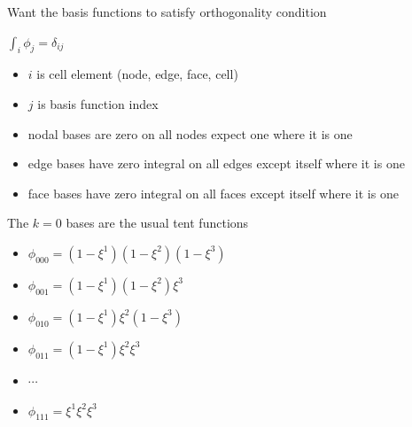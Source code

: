\documentclass[aspectratio=169]{beamer}
\begin{document}
\begin{frame}[fragile]{Want the basis functions to satisfy orthogonality condition}

\begin{block}{$\int_i \phi_j = \delta_{ij}$}
 \begin{itemize}
   \item $i$ is cell element (node, edge, face, cell)
   \item $j$ is basis function index
   \item nodal bases are zero on all nodes expect one where it is one
   \item edge bases have zero integral on all edges except itself where it is one
   \item face bases have zero integral on all faces except itself where it is one
 \end{itemize}
 \end{block}

\end{frame}

\begin{frame}[fragile]{The $k = 0$ bases are the usual tent functions}

\begin{block}{}
\begin{itemize}
\item $\phi_{000} = (1-\xi^1)(1-\xi^2)(1-\xi^3)$
\item $\phi_{001} = (1-\xi^1)(1-\xi^2)\xi^3$
\item $\phi_{010} = (1-\xi^1)\xi^2(1-\xi^3)$
\item $\phi_{011} = (1-\xi^1)\xi^2 \xi^3$
\item $\cdots$
\item $\phi_{111} = \xi^1 \xi^2 \xi^3$
\end{itemize}
 \end{block}

\end{frame}
\end{document}
